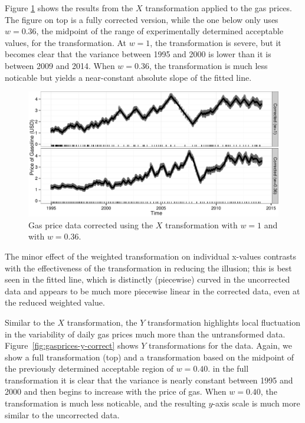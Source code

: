 \documentclass[11pt]{isuthesis}\usepackage[]{graphicx}\usepackage[]{color}
\begin{document}
Figure \ref{fig:gasprices-x-correct} shows the results from the $X$ transformation applied to the gas prices. The figure on top is a fully corrected version, while the one below only uses $w=0.36$, the midpoint of the range of experimentally determined acceptable values,  for the transformation. At $w=1$, the transformation is severe, but it becomes clear that the variance between 1995 and 2000 is lower than it is between 2009 and 2014. When $w=0.36$, the transformation is much less noticable but yields a near-constant absolute slope of the fitted line.

\begin{figure}
\centering
\includegraphics[keepaspectratio=TRUE,width=.92\textwidth]{gas-x-corrected}
\caption[Gas price data, X transformation]{Gas price data corrected using the $X$ transformation with $w=1$ and with $w=0.36$. }
\label{fig:gasprices-x-correct}
\end{figure}
The minor effect of the weighted transformation on individual x-values contrasts with the effectiveness of the transformation in reducing the illusion; this is best seen in the fitted line, which is distinctly (piecewise) curved in the uncorrected data and appears to be much more piecewise linear in the corrected data, even at the reduced weighted value. 

Similar to the $X$ transformation, the $Y$ transformation highlights local fluctuation in the variability of daily gas prices much more than the untransformed data. Figure~\ref{fig:gasprices-y-correct} shows $Y$ transformations for the data. Again, we show a full transformation (top) and a transformation based on the midpoint of the previously determined acceptable region of $w=0.40$.
in the full transformation  it is clear that the variance is nearly constant between 1995 and 2000 and then begins to increase with the price of gas. When $w=0.40$, the transformation is much less noticable, and the resulting $y$-axis scale is much more similar to the uncorrected data. 
\end{document}
